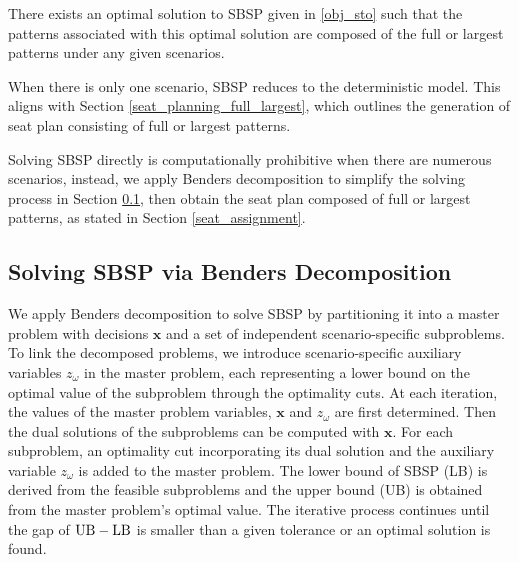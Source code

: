 \begin{prop}\label{prop_solution}
There exists an optimal solution to \textup{SBSP} given in \eqref{obj_sto} such that the patterns associated with this optimal solution are composed of the full or largest patterns under any given scenarios.
\end{prop}

When there is only one scenario, SBSP reduces to the deterministic model. This aligns with Section \ref{seat_planning_full_largest}, which outlines the generation of seat plan consisting of full or largest patterns.


Solving SBSP directly is computationally prohibitive when there are numerous scenarios, instead, we apply Benders decomposition to simplify the solving process in Section \ref{solve_by_benders}, then obtain the seat plan composed of full or largest patterns, as stated in Section \ref{seat_assignment}.

\subsection{Solving SBSP via Benders Decomposition}\label{solve_by_benders}
We apply Benders decomposition \citep{bnnobrs1962partitioning} to solve SBSP by partitioning it into a master problem with decisions $\mathbf{x}$ and a set of independent scenario-specific subproblems. To link the decomposed problems, we introduce scenario-specific auxiliary variables $z_{\omega}$ in the master problem, each representing a lower bound on the optimal value of the subproblem through the optimality cuts. At each iteration, the values of the master problem variables, $\mathbf{x}$ and $z_{\omega}$ are first determined. Then the dual solutions of the subproblems can be computed with $\mathbf{x}$. For each subproblem, an optimality cut incorporating its dual solution and the auxiliary variable $z_{\omega}$ is added to the master problem. The lower bound of SBSP (LB) is derived from the feasible subproblems and the upper bound (UB) is obtained from the master problem's optimal value. The iterative process continues until the gap of $\textup{UB} - \textup{LB}$ is smaller than a given tolerance or an optimal solution is found.




